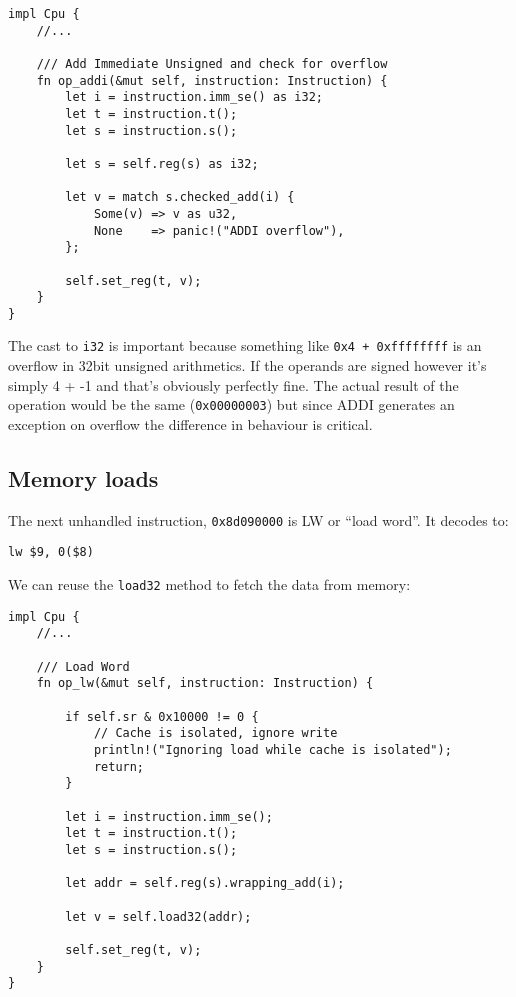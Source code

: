 \documentclass[a4paper]{article}
\newcommand{\code}[1] {\texttt{#1}}
\begin{document}
\begin{lstlisting}
impl Cpu {
    //...

    /// Add Immediate Unsigned and check for overflow
    fn op_addi(&mut self, instruction: Instruction) {
        let i = instruction.imm_se() as i32;
        let t = instruction.t();
        let s = instruction.s();

        let s = self.reg(s) as i32;

        let v = match s.checked_add(i) {
            Some(v) => v as u32,
            None    => panic!("ADDI overflow"),
        };

        self.set_reg(t, v);
    }
}
\end{lstlisting}

The cast to \code{i32} is important because something like
\code{0x4 + 0xffffffff} is an overflow in 32bit unsigned
arithmetics. If the operands are signed however it's simply 4 + -1 and
that's obviously perfectly fine. The actual result of the operation
would be the same (\code{0x00000003}) but since ADDI generates an
exception on overflow the difference in behaviour is critical.

\subsection{Memory loads}

The next unhandled instruction, \code{0x8d090000} is LW or ``load
word''. It decodes to:

\begin{lstlisting}[language=assembly]
lw $9, 0($8)
\end{lstlisting}

We can reuse the \code{load32} method to fetch the data from memory:

\begin{lstlisting}
impl Cpu {
    //...

    /// Load Word
    fn op_lw(&mut self, instruction: Instruction) {

        if self.sr & 0x10000 != 0 {
            // Cache is isolated, ignore write
            println!("Ignoring load while cache is isolated");
            return;
        }

        let i = instruction.imm_se();
        let t = instruction.t();
        let s = instruction.s();

        let addr = self.reg(s).wrapping_add(i);

        let v = self.load32(addr);

        self.set_reg(t, v);
    }
}
\end{lstlisting}
\end{document}

